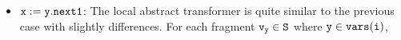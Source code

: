 \begin{itemize}
	
\item ${\tt x := y.next1}$: The local abstract transformer is quite similar to the previous case with slightly differences. For each fragment $\tt v_y \in S$ where $\tt y \in {\tt vars}(\tt i)$,
%
%
%
%
%
%
%

\end{itemize}
